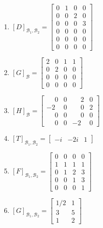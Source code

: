 \documentclass[12pt]{exam}
\begin{document}
\begin{exercicio}
\begin{solucao}
\begin{enumerate}[label={\alph*})]
            \item $[D]_{\mathcal{B}_1, \mathcal{B}_2} = \begin{bmatrix}
                0 & 1 & 0 & 0\\
                0 & 0 & 2 & 0\\
                0 & 0 & 0 & 3\\
                0 & 0 & 0 & 0\\
                0 & 0 & 0 & 0\\
                0 & 0 & 0 & 0
            \end{bmatrix}$

            \item $[G]_\mathcal{B} = \begin{bmatrix}
                2 & 0 & 1 & 1\\
                0 & 2 & 0 & 0\\
                0 & 0 & 0 & 0\\
                0 & 0 & 0 & 0
            \end{bmatrix}$

            \item $[H]_\mathcal{B} = \begin{bmatrix}
                \phantom{-}0 & 0 & \phantom{-}2 & 0\\
                -2 & 0 & \phantom{-}0 & 2\\
                \phantom{-}0 & 0 & \phantom{-}0 & 0\\
                \phantom{-}0 & 0 & -2 & 0
            \end{bmatrix}$

            \item $[T]_{\mathcal{B}_1, \mathcal{B}_2} = \begin{bmatrix}
                -i & -2i & 1
            \end{bmatrix}$

            \item $[F]_{\mathcal{B}_1, \mathcal{B}_2} = \begin{bmatrix}
                0 & 0 & 0 & 0\\
                1 & 1 & 1 & 1\\
                0 & 1 & 2 & 3\\
                0 & 0 & 1 & 3\\
                0 & 0 & 0 & 1
            \end{bmatrix}$

            \item $[G]_{\mathcal{B}_1, \mathcal{B}_2} = \begin{bmatrix}
                1/2 & 1\\
                3 & 5\\
                1 & 2
            \end{bmatrix}$


\end{enumerate}
\end{solucao}
\end{exercicio}
\end{document}
